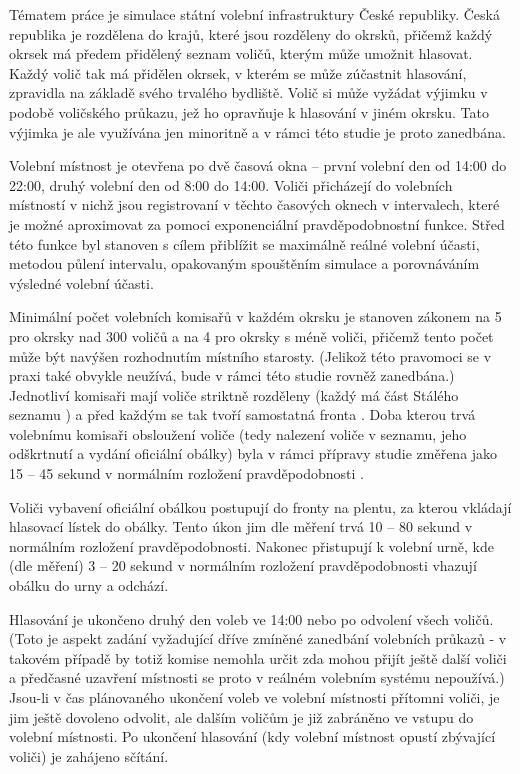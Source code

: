 \documentclass[12pt,a4paper,titlepage,final]{article}
\begin{document}
Tématem práce je simulace \cite[str. 33]{ims} státní volební infrastruktury České republiky. Česká republika je rozdělena do krajů, které jsou rozděleny do okrsků, přičemž každý okrsek má předem přidělený seznam voličů, kterým může umožnit hlasovat. \cite{nssoud4} Každý volič tak má přidělen okrsek, v kterém se může zúčastnit hlasování, zpravidla na základě svého trvalého bydliště. Volič si může vyžádat výjimku v podobě voličského průkazu, jež ho opravňuje k hlasování v jiném okrsku. Tato výjimka je ale využívána jen minoritně a v rámci této studie je proto zanedbána.

Volební místnost je otevřena po dvě časová okna -- první volební den od 14:00 do 22:00, druhý volební den od 8:00 do 14:00. \cite{nssoud1} Voliči přicházejí do volebních místností v nichž jsou registrovaní v těchto časových oknech v intervalech, které je možné aproximovat za pomoci exponenciální pravděpodobnostní funkce. Střed této funkce byl stanoven s cílem přiblížit se maximálně reálné volební účasti, metodou půlení intervalu, opakovaným spouštěním simulace a porovnáváním výsledné volební účasti.

Minimální počet volebních komisařů v každém okrsku je stanoven zákonem na 5 pro okrsky nad 300 voličů a na 4 pro okrsky s méně voliči, přičemž tento počet může být navýšen rozhodnutím místního starosty. \cite{nssoud14} (Jelikož této pravomoci se v praxi také obvykle neužívá, bude v rámci této studie rovněž zanedbána.) Jednotliví komisaři mají voliče striktně rozděleny (každý má část Stálého seznamu \cite{nssoud4}) a před každým se tak tvoří samostatná fronta \cite[str. 138]{ims}. Doba kterou trvá volebnímu komisaři obsloužení voliče (tedy nalezení voliče v seznamu, jeho odškrtnutí a vydání oficiální obálky) byla v rámci přípravy studie změřena jako 15 -- 45 sekund v normálním rozložení pravděpodobnosti \cite[str. 93]{ims}.

Voliči vybavení oficiální obálkou postupují do fronty \cite[str. 138]{ims} na plentu, za kterou vkládají hlasovací lístek do obálky. Tento úkon jim dle měření trvá 10 -- 80 sekund v normálním rozložení pravděpodobnosti. Nakonec přistupují k volební urně, kde (dle měření) 3 -- 20 sekund v normálním rozložení pravděpodobnosti vhazují obálku do urny a odchází.

Hlasování je ukončeno druhý den voleb ve 14:00 nebo po odvolení všech voličů. (Toto je aspekt zadání vyžadující dříve zmíněné zanedbání volebních průkazů - v takovém případě by totiž komise nemohla určit zda mohou přijít ještě další voliči a předčasné uzavření místnosti se proto v reálném volebním systému nepoužívá.) Jsou-li v čas plánovaného ukončení voleb ve volební místnosti přítomni voliči, je jim ještě dovoleno odvolit, ale dalším voličům je již zabráněno ve vstupu do volební místnosti. Po ukončení hlasování (kdy volební místnost opustí zbývající voliči) je zahájeno sčítání.
\end{document}
